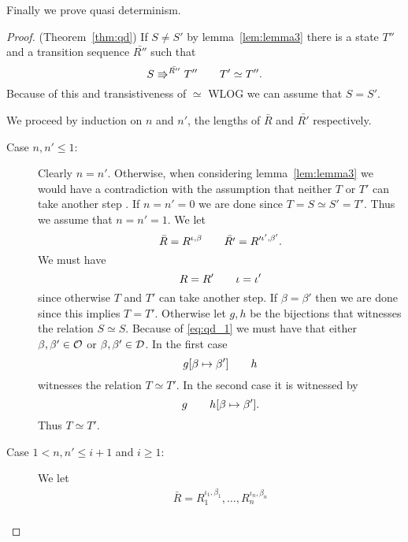 Finally we prove quasi determinism.
\begin{proof}{(Theorem~\ref{thm:qd})}
  If $S \neq S'$ by lemma~\ref{lem:lemma3} there is a state $T''$ and a
  transition sequence $\bar{R''}$ such that
  \begin{equation}
    S \Rrightarrow^{\bar{R''}} T'' \quad\quad T' \simeq T''.
  \end{equation}
  Because of this and transistiveness of $\simeq$ WLOG we can assume that $S =
  S'$.

  We proceed by induction on $n$ and $n'$, the lengths of $\bar{R}$ and
  $\bar{R'}$ respectively.
  \begin{description}
    \item[Case $n, n' \leq 1$:] Clearly $n = n'$. Otherwise, when considering
      lemma~\ref{lem:lemma3} we would have a contradiction with the assumption
      that neither $T$ or $T'$ can take another step .
      If $n = n' = 0$ we are done since $T = S \simeq S' = T'$. Thus we assume
      that $n = n' = 1$. We let
      \begin{equation*}
        \bar{R} = R^{\iota, \beta} \quad\quad \bar{R'} = R'^{\iota', \beta'}.
      \end{equation*}
      We must have 
      \begin{equation} \label{eq:qd_1}
        R = R' \quad\quad \iota = \iota'
      \end{equation} 
      since otherwise $T$ and $T'$ can take another step.  If $\beta = \beta'$
      then we are done since this implies $T = T'$.  Otherwise let $g, h$ be the
      bijections that witnesses the relation $S \simeq S$. Because of
      \eqref{eq:qd_1} we must have that either $\beta, \beta' \in \mathcal{O}$ or
      $\beta, \beta' \in \mathcal{D}$. In the first case 
      \begin{equation}
        g[\beta \mapsto \beta'] \quad\quad h
      \end{equation}
      witnesses the relation $T \simeq T'$. In the second case it is witnessed
      by
      \begin{equation*}
        g \quad\quad h[\beta \mapsto \beta'].
      \end{equation*}
      Thus $T \simeq T'$.
    \item[Case $1 < n, n' \leq i+1$ and $i \geq 1$:] We let 
      \begin{equation*}
        \begin{gathered}
          \bar{R} = R_1^{\iota_1, \beta_1}, \dots, R_n^{\iota_n, \beta_n} \\

\end{gathered}
\end{equation*}
\end{description}
\end{proof}
